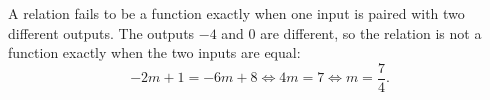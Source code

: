 A relation fails to be a function exactly when one input is paired with two different outputs. The outputs $-4$ and $0$ are different, so the relation is not a function exactly when the two inputs are equal:
\[
-2m+1=-6m+8\iff4m=7\iff m=\boxed{\dfrac{7}{4}}.
\]
